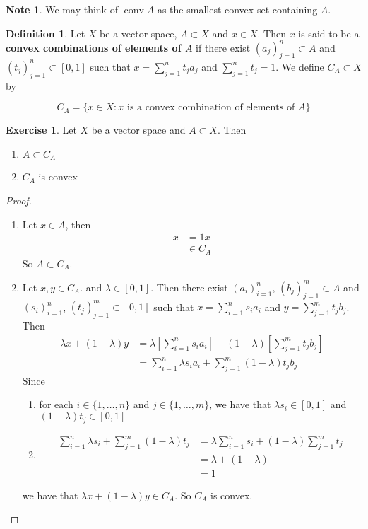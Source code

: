 \documentclass[12pt]{amsart}
\theoremstyle{definition}
\newtheorem{defn}[definition]{Definition}
\newtheorem{note}[definition]{Note}
\newtheorem{ex}[definition]{Exercise}
\newcommand{\lam}{\lambda}
\newcommand{\tbf}[1]{\textbf{#1}}
\DeclareMathOperator{\cnv}{conv}
\DeclareMathOperator*{\0}{\mbf{0}}
\DeclareMathOperator*{\1}{\mbf{1}}
\begin{document}
	\begin{note}
		We may think of $\cnv A$ as the smallest convex set containing $A$. 
	\end{note}

	\begin{defn}
		Let $X$ be a vector space, $A \subset X$ and $x \in X$. Then $x$ is said to be a \tbf{convex combinations of elements of $A$} if there exist $(a_j)_{j=1}^n \subset A$ and $(t_j)_{j=1}^n \subset [0,1]$ such that $x = \sum\limits_{j=1}^n t_j a_j$ and $\sum\limits_{j=1}^n t_j = 1$. We define $C_A \subset X$ by 
		
		$$C_A = \{x \in X:\text{$x$ is a convex combination of elements of $A$}\}$$
	\end{defn}

	\begin{ex}
		Let $X$ be a vector space and $A \subset X$. 
 		Then 
 		\begin{enumerate}
 			\item $A \subset C_A$
 			\item $C_A$ is convex 
 		\end{enumerate}
	\end{ex}

	\begin{proof}\
		\begin{enumerate}
			\item Let $x \in A$, then 
			\begin{align*}
				x 
				&= 1x \\
				& \in C_A 
			\end{align*}
			So $A \subset C_A$.\\
			\item Let $x, y \in C_A$. and $\lam \in [0,1]$. Then there exist $(a_i)_{i=1}^n$, $(b_j)_{j=1}^m \subset A$ and $(s_i)_{i=1}^n$, $(t_j)_{j=1}^m \subset [0,1]$ such that $x = \sum\limits_{i=1}^n s_i a_i$ and $y = \sum\limits_{j=1}^m t_j b_j$. Then
			\begin{align*}
				\lam x + (1-\lam)y 
				&= \lam [\sum\limits_{i=1}^n s_i a_i] + (1-\lam)[\sum\limits_{j=1}^m t_j b_j] \\
				&= \sum\limits_{i=1}^n \lam s_i a_i + \sum\limits_{j=1}^m (1-\lam) t_j b_j
			\end{align*}
			Since 
			\begin{enumerate}
				\item for each $i \in \{1, \ldots, n\}$ and $j \in \{1, \ldots, m\}$, we have that $\lam s_i \in [0,1]$ and $(1-\lam)t_j \in [0,1]$
				\item 
				\begin{align*}
					\sum\limits_{i=1}^n \lam s_i + \sum\limits_{j=1}^m (1-\lam) t_j
					&= \lam \sum\limits_{i=1}^n s_i +  (1-\lam) \sum\limits_{j=1}^m  t_j \\
					&= \lam + (1-\lam) \\
					&= 1
				\end{align*}
			\end{enumerate}
			we have that $\lam x+(1-\lam) y \in C_A$. So $C_A$ is convex.
		\end{enumerate}
	\end{proof}
\end{document}
